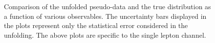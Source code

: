 \begin{figure}[ht]
  \quad\quad
  \quad\quad
  \quad\quad
  \caption{Comparison of the unfolded pseudo-data and the true distribution as a function of various observables. The uncertainty bars displayed in the plots represent only the statistical error considered in the unfolding. The above plots are specific to the single lepton channel.}
  \label{fig:unfolded_ljet_dist_closure}
\end{figure}
\FloatBarrier


